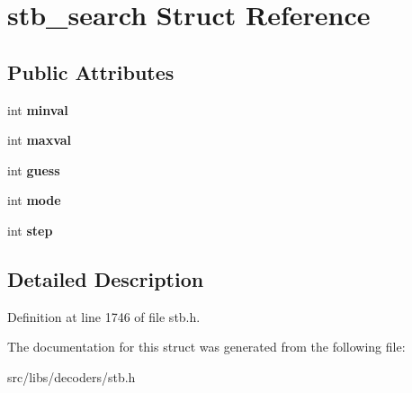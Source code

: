 \hypertarget{structstb__search}{\section{stb\-\_\-search Struct Reference}
\label{structstb__search}
}
\subsection*{Public Attributes}
\begin{DoxyCompactItemize}
\item 
\hypertarget{structstb__search_a794d1ad2f6f9b7cf464388a4da64b47b}{int {\bfseries minval}}\label{structstb__search_a794d1ad2f6f9b7cf464388a4da64b47b}

\item 
\hypertarget{structstb__search_a3f766e480f40bc9c8bb09c1807e0d16a}{int {\bfseries maxval}}\label{structstb__search_a3f766e480f40bc9c8bb09c1807e0d16a}

\item 
\hypertarget{structstb__search_a24ccea6383389e0cdd0de201cdb1b732}{int {\bfseries guess}}\label{structstb__search_a24ccea6383389e0cdd0de201cdb1b732}

\item 
\hypertarget{structstb__search_a656a037112af1428e9d760bb1aa76066}{int {\bfseries mode}}\label{structstb__search_a656a037112af1428e9d760bb1aa76066}

\item 
\hypertarget{structstb__search_a8f890c99f953c4a2c5c1cf8cfac4a6ab}{int {\bfseries step}}\label{structstb__search_a8f890c99f953c4a2c5c1cf8cfac4a6ab}

\end{DoxyCompactItemize}


\subsection{Detailed Description}


Definition at line 1746 of file stb.\-h.



The documentation for this struct was generated from the following file\-:\begin{DoxyCompactItemize}
\item 
src/libs/decoders/stb.\-h\end{DoxyCompactItemize}
